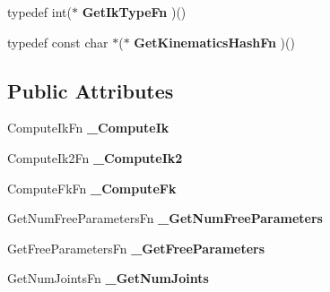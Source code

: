 \begin{DoxyCompactItemize}
\item 
\hypertarget{classikfast_1_1IkFastFunctions_a021e3fbd64fd58836e04469fd340108e}{typedef int($\ast$ {\bfseries Get\-Ik\-Type\-Fn} )()}\label{classikfast_1_1IkFastFunctions_a021e3fbd64fd58836e04469fd340108e}

\item 
\hypertarget{classikfast_1_1IkFastFunctions_a5978dc6cbc708ab07bee0b595ecf0e60}{typedef const char $\ast$($\ast$ {\bfseries Get\-Kinematics\-Hash\-Fn} )()}\label{classikfast_1_1IkFastFunctions_a5978dc6cbc708ab07bee0b595ecf0e60}

\end{DoxyCompactItemize}
\subsection*{Public Attributes}
\begin{DoxyCompactItemize}
\item 
\hypertarget{classikfast_1_1IkFastFunctions_a75775a9a8c284f52cb6cc473c434163c}{Compute\-Ik\-Fn {\bfseries \-\_\-\-Compute\-Ik}}\label{classikfast_1_1IkFastFunctions_a75775a9a8c284f52cb6cc473c434163c}

\item 
\hypertarget{classikfast_1_1IkFastFunctions_a80a08b6a3fb3cd0e60e25fc6384d733c}{Compute\-Ik2\-Fn {\bfseries \-\_\-\-Compute\-Ik2}}\label{classikfast_1_1IkFastFunctions_a80a08b6a3fb3cd0e60e25fc6384d733c}

\item 
\hypertarget{classikfast_1_1IkFastFunctions_a5a30a89afe6314eb86a05c3bd5a1a303}{Compute\-Fk\-Fn {\bfseries \-\_\-\-Compute\-Fk}}\label{classikfast_1_1IkFastFunctions_a5a30a89afe6314eb86a05c3bd5a1a303}

\item 
\hypertarget{classikfast_1_1IkFastFunctions_ac78c6f4a428df5b34944510af3abd68f}{Get\-Num\-Free\-Parameters\-Fn {\bfseries \-\_\-\-Get\-Num\-Free\-Parameters}}\label{classikfast_1_1IkFastFunctions_ac78c6f4a428df5b34944510af3abd68f}

\item 
\hypertarget{classikfast_1_1IkFastFunctions_a2c57255d31921839afb1ed5c5f86c7cc}{Get\-Free\-Parameters\-Fn {\bfseries \-\_\-\-Get\-Free\-Parameters}}\label{classikfast_1_1IkFastFunctions_a2c57255d31921839afb1ed5c5f86c7cc}

\item 
\hypertarget{classikfast_1_1IkFastFunctions_aa7aadc4d797b2ecc3811a7887b0b0dfc}{Get\-Num\-Joints\-Fn {\bfseries \-\_\-\-Get\-Num\-Joints}}\label{classikfast_1_1IkFastFunctions_aa7aadc4d797b2ecc3811a7887b0b0dfc}


\end{DoxyCompactItemize}
